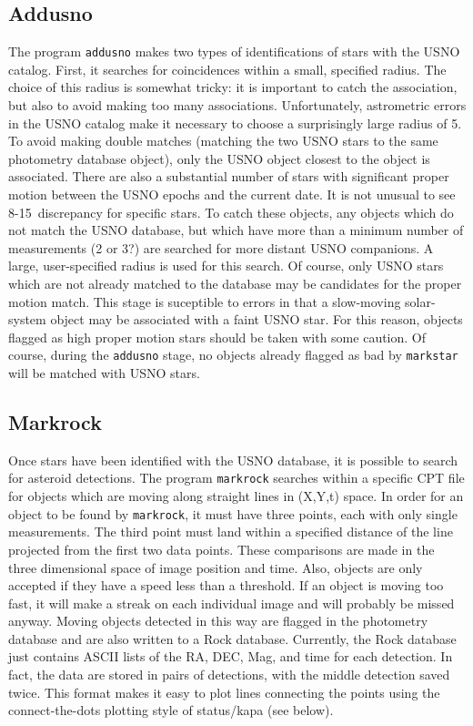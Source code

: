 \documentclass{article}
\begin{document}
\subsection{Addusno}

The program {\tt addusno} makes two types of identifications of stars
with the USNO catalog.  First, it searches for coincidences within a
small, specified radius.  The choice of this radius is somewhat
tricky: it is important to catch the association, but also to avoid
making too many associations.  Unfortunately, astrometric errors in
the USNO catalog make it necessary to choose a surprisingly large
radius of 5\asec.  To avoid making double matches (matching the two
USNO stars to the same photometry database object), only the USNO
object closest to the object is associated.  There are also a
substantial number of stars with significant proper motion between the
USNO epochs and the current date.  It is not unusual to see 8-15\asec\ 
discrepancy for specific stars.  To catch these objects, any objects
which do not match the USNO database, but which have more than a
minimum number of measurements (2 or 3?) are searched for more distant
USNO companions.  A large, user-specified radius is used for this
search.  Of course, only USNO stars which are not already matched to
the database may be candidates for the proper motion match.  This
stage is suceptible to errors in that a slow-moving solar-system
object may be associated with a faint USNO star.  For this reason,
objects flagged as high proper motion stars should be taken with some
caution.  Of course, during the {\tt addusno} stage, no objects
already flagged as bad by {\tt markstar} will be matched with USNO
stars.  

\subsection{Markrock}

Once stars have been identified with the USNO database, it is possible
to search for asteroid detections.  The program {\tt markrock}
searches within a specific CPT file for objects which are moving along
straight lines in (X,Y,t) space.  In order for an object to be found
by {\tt markrock}, it must have three points, each with only single
measurements.  The third point must land within a specified distance
of the line projected from the first two data points.  These
comparisons are made in the three dimensional space of image position
and time.  Also, objects are only accepted if they have a speed less
than a threshold.  If an object is moving too fast, it will make a
streak on each individual image and will probably be missed anyway.
Moving objects detected in this way are flagged in the photometry
database and are also written to a Rock database.  Currently, the Rock
database just contains ASCII lists of the RA, DEC, Mag, and time for
each detection.  In fact, the data are stored in pairs of detections,
with the middle detection saved twice.  This format makes it easy to
plot lines connecting the points using the connect-the-dots plotting
style of status/kapa (see below).
\end{document}
